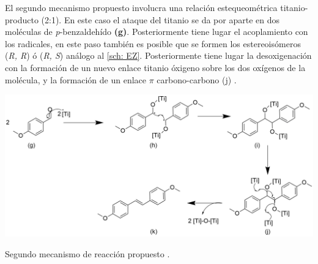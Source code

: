 \documentclass[fleqn,11pt]{SelfArx}
\begin{document}
El segundo mecanismo propuesto involucra una relaci\'on estequeom\'etrica titanio-producto (2:1). En este caso el ataque del titanio se da por aparte en dos mol\'eculas de \textit{p}-benzaldeh\'ido \textbf{(g)}. Posteriormente tiene lugar el acoplamiento con los radicales, en este paso tambi\'en es posible que se formen los estereois\'omeros (\textit{R, R}) \'o (\textit{R, S}) an\'alogo al \autoref{sch: EZ}. Posteriormente tiene lugar la desoxigenaci\'on con la formaci\'on de un nuevo enlace titanio \'oxigeno sobre los dos ox\'igenos de la mol\'ecula, y la formaci\'on de un enlace $\pi$ carbono-carbono (j) \cite{Wang2010}.
\begin{scheme}[h]
	\centering
	\includegraphics[width = \linewidth]{structures/mechanism2.png}
	\caption{Segundo mecanismo de reacci\'on propuesto \cite{Wang2010}.}
\end{scheme}
\end{document}
